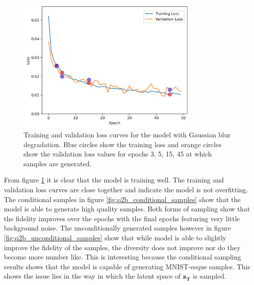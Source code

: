 \documentclass[11pt]{article}
\begin{document}
\begin{figure}[H]
    \centering
    \includegraphics[width=0.8\textwidth]{figs/q2b_blur_loss.png}
    \caption{Training and validation loss curves for the model with Gaussian blur degradation. Blue circles show the training loss and orange circles show the validation loss values for epochs 3, 5, 15, 45 at which samples are generated.}
    \label{fig:q2b_loss}
\end{figure}


From figure \ref{fig:q2b_loss} it is clear that the model is training well. The training and validation loss curves are close together and indicate the model is not overfitting. The conditional samples in figure \ref{fig:q2b_conditional_samples} show that the model is able to generate high quality samples. Both forms of sampling show that the fidelity improves over the epochs with the final epochs featuring very little background noise. The unconditionally generated samples however  in figure \ref{fig:q2b_unconditional_samples} show that while model is able to slightly improve the fidelity of the samples, the diversity does not improve nor do they become more number like. This is interesting because the conditional sampling results shows that the model is capable of generating MNIST-esque samples. This shows the issue lies in the way in which the latent space of $\mathbf{z_T}$ is sampled.
\end{document}
